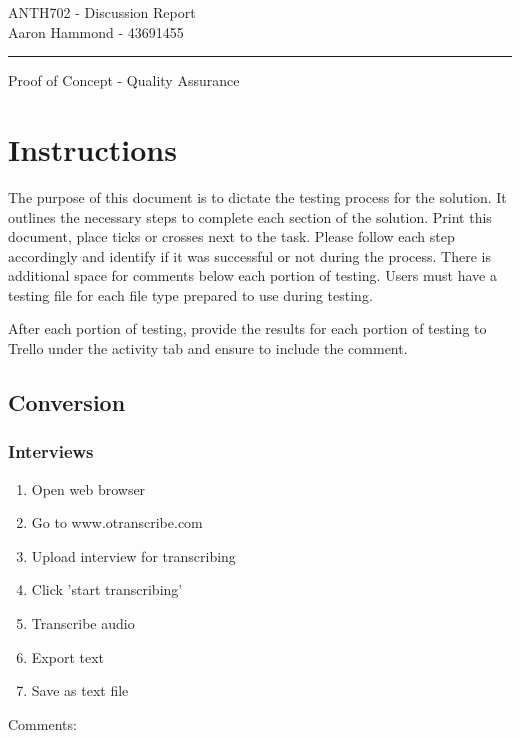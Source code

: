 \documentclass[11pt, a4paper,]{scrartcl}
\begin{document}

\begin{flushleft}{\footnotesize{}
ANTH702 - Discussion Report\\
Aaron Hammond - 43691455
}
\end{flushleft}

\hrule
\begin{center}
\large{Proof of Concept - Quality Assurance}
\end{center}

\section{Instructions}
The purpose of this document is to dictate the testing process for the solution. It outlines the necessary steps to complete each section of the solution. Print this document, place ticks or crosses next to the task. Please follow each step accordingly and identify if it was successful or not during the process. There is additional space for comments below each portion of testing. Users must have a testing file for each file type prepared to use during testing.\par

After each portion of testing, provide the results for each portion of testing to Trello under the activity tab and ensure to include the comment.

\subsection{Conversion}
\subsubsection{Interviews}
\begin{enumerate}
    \item Open web browser
    \item Go to www.otranscribe.com
    \item Upload interview for transcribing
    \item Click 'start transcribing'
    \item Transcribe audio
    \item Export text
    \item Save as text file
\end{enumerate}
Comments:
\vspace{2cm}
\end{document}
